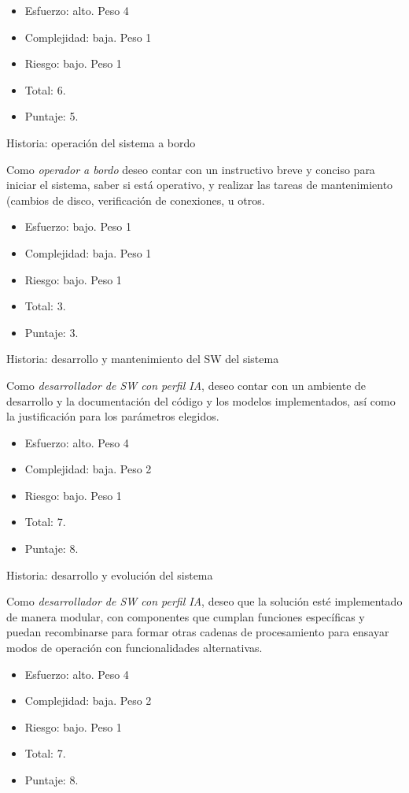 \documentclass[11pt]{charter}
\begin{document}
\begin{itemize}
	\item Esfuerzo: alto. Peso 4
	\item Complejidad: baja. Peso 1
	\item Riesgo: bajo. Peso 1
	\item Total: 6.
	\item Puntaje: 5.
\end{itemize}

Historia: operación del sistema a bordo

Como {\em operador a bordo} deseo contar con un instructivo breve y conciso para iniciar el sistema, saber si está operativo, y realizar las tareas de mantenimiento (cambios de disco, verificación de conexiones, u otros.
	
\begin{itemize}
	\item Esfuerzo: bajo. Peso 1
	\item Complejidad: baja. Peso 1
	\item Riesgo: bajo. Peso 1
	\item Total: 3.
	\item Puntaje: 3.
\end{itemize}

Historia: desarrollo y mantenimiento del SW del sistema

Como {\em desarrollador de SW con perfil IA}, deseo contar con un ambiente de desarrollo y la documentación del código y los modelos implementados, así como la justificación para los parámetros elegidos. 
\begin{itemize}
	\item Esfuerzo: alto. Peso 4
	\item Complejidad: baja. Peso 2
	\item Riesgo: bajo. Peso 1
	\item Total: 7.
	\item Puntaje: 8.
\end{itemize}

Historia: desarrollo y evolución del sistema

Como {\em desarrollador de SW con perfil IA}, deseo que la solución esté implementado de manera modular, con componentes que cumplan funciones específicas y puedan recombinarse para formar otras cadenas de procesamiento para ensayar modos de operación con funcionalidades alternativas.
\begin{itemize}
	\item Esfuerzo: alto. Peso 4
	\item Complejidad: baja. Peso 2
	\item Riesgo: bajo. Peso 1
	\item Total: 7.
	\item Puntaje: 8.
\end{itemize}	
\end{document}
